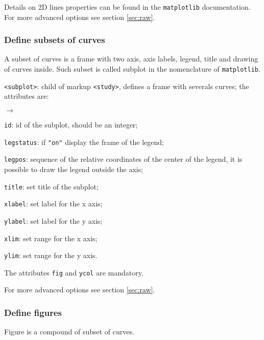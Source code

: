\documentclass[a4paper,10pt,twoside]{csshortdoc}
\begin{document}
Details on 2D lines properties can be found in the \texttt{matplotlib}
documentation. For more advanced options see section \ref{sec:raw}.

\subsubsection{Define subsets of curves}

A subset of curves is a frame with two axis, axis labels, legend, title and
drawing of curves inside. Such subset is called subplot in the nomenclature
of \texttt{matplotlib}.

\texttt{<subplot>}: child of markup \texttt{<study>}, defines a frame with
severals curves; the attributes are:
\begin{list}{$\rightarrow$}{}
\item \texttt{id}: id of the subplot, should be an integer;
\item \texttt{legstatus}: if \texttt{"on"} display the frame of the legend;
\item \texttt{legpos}: sequence of the relative coordinates of the center of
the legend, it is possible to draw the legend outside the axis;
\item \texttt{title}: set title of the subplot;
\item \texttt{xlabel}: set label for the x axis;
\item \texttt{ylabel}: set label for the y axis;
\item \texttt{xlim}: set range for the x axis;
\item \texttt{ylim}: set range for the y axis.
\end{list}

The attributes \texttt{fig} and \texttt{ycol} are mandatory.

For more advanced options see section \ref{sec:raw}.

\subsubsection{Define figures}

Figure is a compound of subset of curves.
\end{document}
